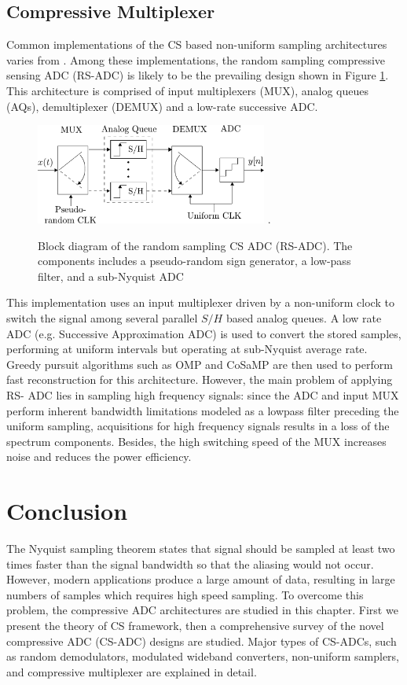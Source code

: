 \subsection{Compressive Multiplexer}
\indent \indent Common implementations of the CS based non-uniform sampling architectures varies from \cite{laska2006random, ragheb2007implementation, maechler2011random, rogers2011compressive}. Among these implementations, the random sampling compressive sensing ADC (RS-ADC) is likely to be the prevailing design shown in Figure \ref{RS-ADC}. This architecture is comprised of input multiplexers (MUX), analog queues (AQs), demultiplexer (DEMUX) and a low-rate successive ADC. 
\begin{figure}
\centering
\includegraphics[width=3.0in]{figs/RSADC.pdf}
\DeclareGraphicsExtensions.
\caption{Block diagram of the random sampling CS ADC (RS-ADC). The components includes a pseudo-random sign generator, a low-pass filter, and a sub-Nyquist ADC}\label{RS-ADC}
\end{figure}

This implementation uses an input multiplexer driven by a non-uniform clock to switch the signal among several parallel $S/H$ based analog queues. A low rate ADC (e.g. Successive Approximation ADC) is used to convert the stored samples, performing at uniform intervals but operating at sub-Nyquist average rate. Greedy pursuit algorithms such as OMP and CoSaMP are then used to perform fast reconstruction for this architecture. However, the main problem of applying RS- ADC lies in sampling high frequency signals: since the ADC and input MUX perform inherent bandwidth limitations modeled as a lowpass filter preceding the uniform sampling, acquisitions for high frequency signals results in a loss of the spectrum components. Besides, the high switching speed of the MUX increases noise and reduces the power efficiency.

\section{Conclusion}\label{sct:cs_conclusion}
\indent \indent The Nyquist sampling theorem states that signal should be sampled at least two times faster than the signal bandwidth so that the aliasing would not occur. However, modern applications produce a large amount of data, resulting in large numbers of samples which requires high speed sampling. To overcome this problem, the compressive ADC architectures are studied in this chapter. First we present the theory of CS framework, then a comprehensive survey of the novel compressive ADC (CS-ADC) designs are studied. Major types of CS-ADCs, such as random demodulators, modulated wideband converters, non-uniform samplers, and compressive multiplexer are explained in detail. 


